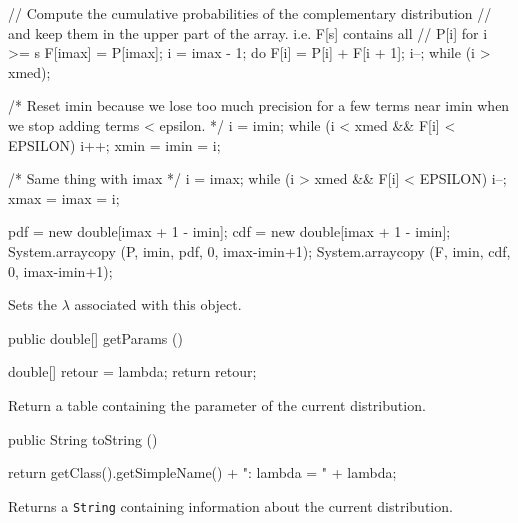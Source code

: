 \begin{code}
\begin{hide}
{      // Compute the cumulative probabilities of the complementary distribution
      // and keep them in the upper part of the array. i.e. F[s] contains all
      // P[i] for i >= s
      F[imax] = P[imax];
      i = imax - 1;
      do {
         F[i] = P[i] + F[i + 1];
         i--;
      } while (i > xmed);

       /* Reset imin because we lose too much precision for a few terms near
      imin when we stop adding terms < epsilon. */
      i = imin;
      while (i < xmed && F[i] < EPSILON)
         i++;
      xmin = imin = i;

      /* Same thing with imax */
      i = imax;
      while (i > xmed && F[i] < EPSILON)
         i--;
      xmax = imax = i;

      pdf = new double[imax + 1 - imin];
      cdf = new double[imax + 1 - imin];
      System.arraycopy (P, imin, pdf, 0, imax-imin+1);
      System.arraycopy (F, imin, cdf, 0, imax-imin+1);
   }\end{hide}
\end{code}
\begin{tabb}
   Sets the $\lambda$ associated with this object.
\end{tabb}
\begin{code}

   public double[] getParams ()\begin{hide} {
      double[] retour = {lambda};
      return retour;
   }\end{hide}
\end{code}
\begin{tabb}
   Return a table containing the parameter of the current distribution.
\end{tabb}
\begin{hide}\begin{code}

   public String toString ()\begin{hide} {
      return getClass().getSimpleName() + ": lambda = " + lambda;
   }\end{hide}
\end{code}
\begin{tabb}
   Returns a \texttt{String} containing information about the current distribution.
\end{tabb}\end{hide}
\begin{code}\begin{hide}
}\end{hide}
\end{code}
